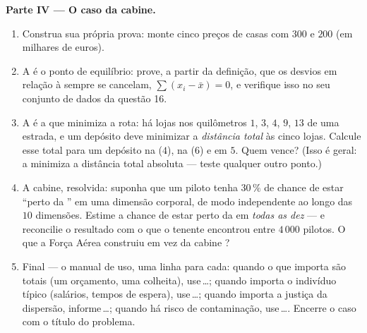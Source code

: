 \begin{problem}
\medskip
\noindent\textbf{Parte IV --- O caso da cabine.}
\begin{enumerate}[resume]
  \item Construa sua própria prova: monte cinco preços de casas
        com  $300$ e  $200$ (em milhares de euros).
  \item A  é o ponto de equilíbrio: prove, a partir da
        definição, que os desvios em relação à  sempre se
        cancelam, $\sum (x_i - \bar x) = 0$, e verifique isso no
        seu conjunto de dados da questão 16.
  \item A  é a que minimiza a rota: há lojas nos
        quilômetros $1$, $3$, $4$, $9$, $13$ de uma estrada, e um
        depósito deve minimizar a \emph{distância total} às cinco
        lojas. Calcule esse total para um depósito na 
        ($4$), na  ($6$) e em $5$. Quem vence? (Isso é
        geral: a  minimiza a distância total absoluta ---
        teste qualquer outro ponto.)
  \item A cabine, resolvida: suponha que um piloto tenha
        $30\,\%$ de chance de estar ``perto da '' em uma
        dimensão corporal, de modo independente ao longo das $10$
        dimensões. Estime a chance de estar perto da  em
        \emph{todas as dez} --- e reconcilie o resultado com o
        que o tenente encontrou entre $4\,000$ pilotos. O que a
        Força Aérea construiu em vez da cabine ?
  \item Final --- o manual de uso, uma linha para cada: quando o
        que importa são totais (um orçamento, uma colheita),
        use\,\dots; quando importa o indivíduo típico (salários,
        tempos de espera), use\,\dots; quando importa a justiça
        da dispersão, informe\,\dots; quando há risco de
        contaminação, use\,\dots. Encerre o caso com o título do
        problema.
\end{enumerate}
\end{problem}
